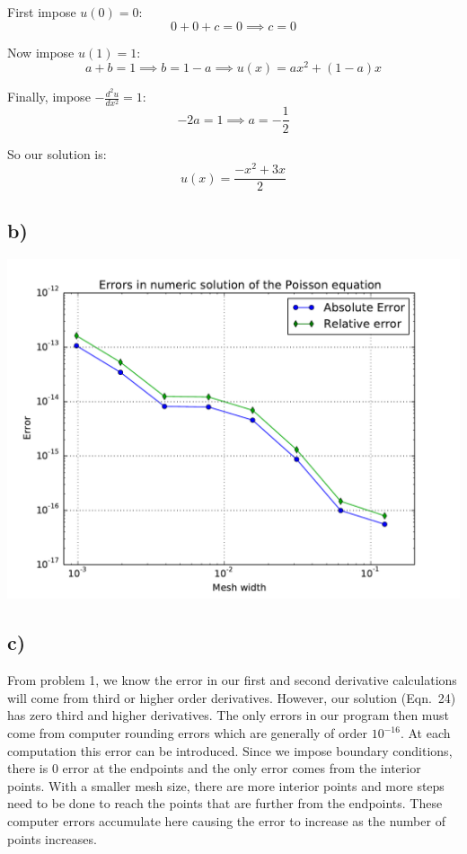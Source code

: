 \documentclass{article}
\begin{document}
First impose $u(0)=0$:
\begin{equation}
0+0+c=0\implies c=0
\end{equation}

Now impose $u(1)=1$:
\begin{equation}
a+b=1\implies b=1-a \implies u(x)=ax^2+(1-a)x
\end{equation}

Finally, impose $-\frac{d^2u}{dx^2}=1$:
\begin{equation}
-2a=1\implies a=-\frac{1}{2}
\end{equation}

So our solution is:
\begin{equation}
\boxed{u(x)=\frac{-x^2+3x}{2}}
\end{equation}

\subsection*{b)}
\includegraphics[width=\linewidth]{PoissonError.pdf}
\subsection*{c)}
From problem 1, we know the error in our first and second derivative calculations will come from third or higher order derivatives. However, our solution (Eqn.\ 24) has zero third and higher derivatives. The only errors in our program then must come from computer rounding errors which are generally of order $10^{-16}$. At each computation this error can be introduced. Since we impose boundary conditions, there is 0 error at the endpoints and the only error comes from the interior points. With a smaller mesh size, there are more interior points and more steps need to be done to reach the points that are further from the endpoints. These computer errors accumulate here causing the error to increase as the number of points increases.
\end{document}

